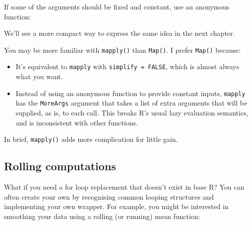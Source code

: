 If some of the arguments should be fixed and constant, use an anonymous
function:

\begin{Shaded}
\begin{Highlighting}[]
\NormalTok{(} 
\end{Highlighting}
\end{Shaded}

We'll see a more compact way to express the same idea in the next
chapter.

\begin{shortbox}

You may be more familiar with \texttt{mapply()} than \texttt{Map()}. I
prefer \texttt{Map()} because:

\begin{itemize}
\item
  It's equivalent to \texttt{mapply} with \texttt{simplify\ =\ FALSE},
  which is almost always what you want.
\item
  Instead of using an anonymous function to provide constant inputs,
  \texttt{mapply} has the \texttt{MoreArgs} argument that takes a list
  of extra arguments that will be supplied, as is, to each call. This
  breaks R's usual lazy evaluation semantics, and is inconsistent with
  other functions.
\end{itemize}

In brief, \texttt{mapply()} adds more complication for little gain.

\end{shortbox}

\hypertarget{rolling-computations}{%
\subsection{Rolling computations}\label{rolling-computations}}

What if you need a for loop replacement that doesn't exist in base R?
You can often create your own by recognising common looping structures
and implementing your own wrapper. For example, you might be interested
in smoothing your data using a rolling (or running) mean function:

